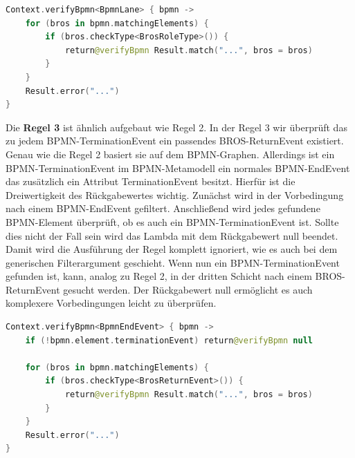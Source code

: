 \begin{lstlisting}[language=Kotlin, caption=Implementierung von Regel 2, label=lst:implementation_rule_2]
Context.verifyBpmn<BpmnLane> { bpmn ->
    for (bros in bpmn.matchingElements) {
        if (bros.checkType<BrosRoleType>()) {
            return@verifyBpmn Result.match("...", bros = bros)
        }
    }
    Result.error("...")
}
\end{lstlisting}

Die \textbf{Regel 3} ist ähnlich aufgebaut wie Regel 2.
In der Regel 3 wir überprüft das zu jedem BPMN-TerminationEvent ein passendes BROS-ReturnEvent existiert.
Genau wie die Regel 2 basiert sie auf dem BPMN-Graphen.
Allerdings ist ein BPMN-TerminationEvent im BPMN-Metamodell ein normales BPMN-EndEvent das zusätzlich ein Attribut TerminationEvent besitzt.
Hierfür ist die Dreiwertigkeit des Rückgabewertes wichtig.
Zunächst wird in der Vorbedingung nach einem BPMN-EndEvent gefiltert.
Anschließend wird jedes gefundene BPMN-Element überprüft, ob es auch ein BPMN-TerminationEvent ist.
Sollte dies nicht der Fall sein wird das Lambda mit dem Rückgabewert null beendet.
Damit wird die Ausführung der Regel komplett ignoriert, wie es auch bei dem generischen Filterargument geschieht.
Wenn nun ein BPMN-TerminationEvent gefunden ist, kann, analog zu Regel 2, in der dritten Schicht nach einem BROS-ReturnEvent gesucht werden.
Der Rückgabewert null ermöglicht es auch komplexere Vorbedingungen leicht zu überprüfen.

\begin{lstlisting}[language=Kotlin, caption=Implementierung von Regel 3, label=lst:implementation_rule_3]
Context.verifyBpmn<BpmnEndEvent> { bpmn ->
    if (!bpmn.element.terminationEvent) return@verifyBpmn null

    for (bros in bpmn.matchingElements) {
        if (bros.checkType<BrosReturnEvent>()) {
            return@verifyBpmn Result.match("...", bros = bros)
        }
    }
    Result.error("...")
}
\end{lstlisting}

